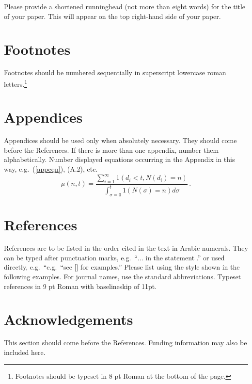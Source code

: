 \documentclass{ws-ijseke}
\begin{document}
Please provide a shortened runninghead (not more than eight words) for
the title of your paper. This will appear on the top right-hand side
of your paper.

\section{Footnotes}

Footnotes should be numbered sequentially in superscript
lowercase roman letters.\footnote{Footnotes should be
typeset in 8 pt Roman at the bottom of the page.}

\appendix

\section{Appendices}

Appendices should be used only when absolutely necessary. They
should come before the References. If there is more than one
appendix, number them alphabetically. Number displayed equations
occurring in the Appendix in this way, e.g.~(\ref{appeqn}), (A.2),
etc.
\begin{equation}
\mu(n, t) = \frac{\sum^\infty_{i=1} 1(d_i < t, N(d_i) 
= n)}{\int^t_{\sigma=0} 1(N(\sigma) = n)d\sigma}\,.
\label{appeqn}
\end{equation}

\section*{References}
References are to be listed in the order cited in the text in Arabic 
numerals.  They can be typed after punctuation marks, 
e.g.~``$\ldots$ in the statement \cite{birk}.'' or used directly,
e.g.~``e.g.~``see [] for examples.'' Please list 
using the style shown in the following examples.  For journal names, 
use the standard abbreviations.  Typeset references in 9 pt Roman 
with baselineskip of 11pt.

\section*{Acknowledgements}

This section should come before the References. Funding
information may also be included here.
\end{document}
